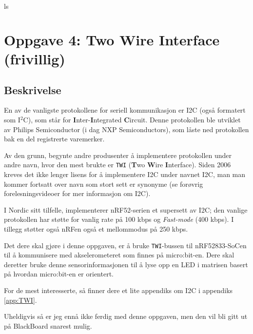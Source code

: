 ls
\section{Oppgave 4: Two Wire Interface (frivillig)}

\subsection{Beskrivelse}

En av de vanligste protokollene for seriell kommunikasjon er I2C (også formatert som I$^2$C), som står for \textbf{I}nter-\textbf{I}ntegrated \textbf{C}ircuit. Denne protokollen ble utviklet av Philips Semiconductor (i dag NXP Semiconductors), som låste ned protokollen bak en del registrerte varemerker.

Av den grunn, begynte andre produsenter å implementere protokollen under andre navn, hvor den mest brukte er \verb|TWI| (\textbf{T}wo \textbf{W}ire \textbf{I}nterface). Siden 2006 kreves det ikke lenger lisens for å implementere I2C under navnet I2C, man man kommer fortsatt over navn som stort sett er synonyme (se forøvrig forelesningsvideoer for mer informasjon om I2C).

I Nordic sitt tilfelle, implementerer nRF52-serien et supersett av I2C; den vanlige protokollen har støtte for vanlig rate på 100 kbps og \textit{Fast-mode} (400 kbps). I tillegg støtter også nRFen også et mellommodus på 250 kbps.

Det dere skal gjøre i denne oppgaven, er å bruke \verb|TWI|-bussen til nRF52833-SoCen til å kommunisere med akselerometeret som finnes på micro:bit-en. Dere skal deretter bruke denne sensorinformasjonen til å lyse opp en LED i matrisen basert på hvordan micro:bit-en er orientert.

For de mest interesserte, så finner dere et lite appendiks om I2C i appendiks \ref{app:TWI}.

Uheldigvis så er jeg ennå ikke ferdig med denne oppgaven, men den vil bli gitt ut på BlackBoard snarest mulig.




